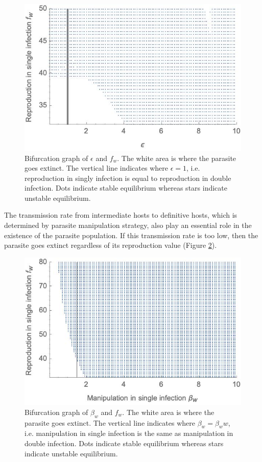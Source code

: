\documentclass{article}
\begin{document}
\begin{figure}
\includegraphics[width = \textwidth]{Figures/bifurcation_epsilonfw_NL.jpg}
\caption{Bifurcation graph of $\epsilon$ and $f_w$. The white area is where the parasite goes extinct. The vertical line indicates where $\epsilon = 1$, i.e. reproduction in singly infection is equal to reproduction in double infection. Dots indicate stable equilibrium whereas stars indicate unstable equilibrium.}
\label{fig:bifurepsilonfw:nonlinear}
\end{figure}

The transmission rate from intermediate hosts to definitive hosts, which is determined by parasite manipulation strategy, also play an essential role in the existence of the parasite population. 
If this transmission rate is too low, then the parasite goes extinct regardless of its reproduction value (Figure \ref{fig:bifurbetawfw:nonlinear}).

\begin{figure}
\includegraphics[width=\textwidth]{Figures/bifurcation_betawfw_NL.jpg}
\caption{Bifurcation graph of $\beta_w$ and $f_w$. The white area is where the parasite goes extinct. The vertical line indicates where $\beta_w = \beta_ww$, i.e. manipulation in single infection is the same as manipulation in double infection. Dots indicate stable equilibrium whereas stars indicate unstable equilibrium.}
\label{fig:bifurbetawfw:nonlinear}
\end{figure}
\end{document}

